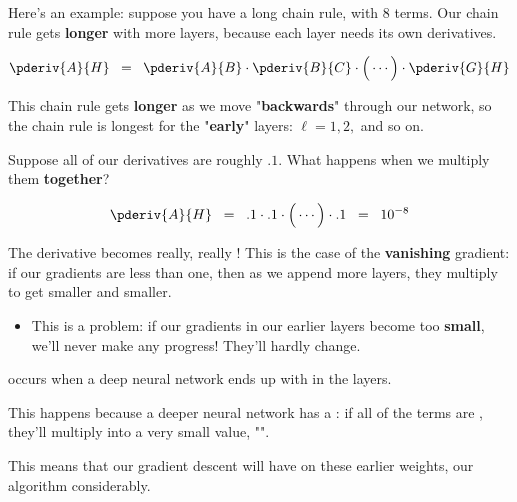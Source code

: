         Here's an example: suppose you have a long chain rule, with 8 terms. Our chain rule gets \textbf{longer} with more layers, because each layer needs its own derivatives.
        
        \begin{equation}
            \pderiv{A}{H}
            \;\;=\;\;
            \pderiv{A}{B}
            \cdot
            \pderiv{B}{C}
            \cdot
            \Big(
            \cdots
            \Big)
            \cdot
            \pderiv{G}{H}
        \end{equation}
        
        This chain rule gets \textbf{longer} as we move "\textbf{backwards}" through our network, so the chain rule is longest for the "\textbf{early}" layers: $\ell=1, 2,$ and so on.
        
        Suppose all of our derivatives are roughly $.1$. What happens when we multiply them \textbf{together}?
        
        \begin{equation}
            \pderiv{A}{H}
            \;\; = \;\;
            .1 \cdot .1 \cdot 
            \Big(
            \cdots
            \Big)
            \cdot 
            .1
            \;\; = \;\;
            10^{-8}
        \end{equation}
        
        The derivative becomes really, really ! This is the case of the \textbf{vanishing} gradient: if our gradients are less than one, then as we append more layers, they multiply to get smaller and smaller.

        \begin{itemize}
            \item This is a problem: if our gradients in our earlier layers become too \textbf{small}, we'll never make any progress! They'll hardly change.\\
        \end{itemize}
        
        
        
        \begin{definition}
             occurs when a deep neural network ends up with  in the  layers. 
            
            This happens because a deeper neural network has a : if all of the terms are , they'll multiply into a very small value, "".
            
            This means that our gradient descent will have  on these earlier weights,  our algorithm considerably.
        \end{definition}
        
